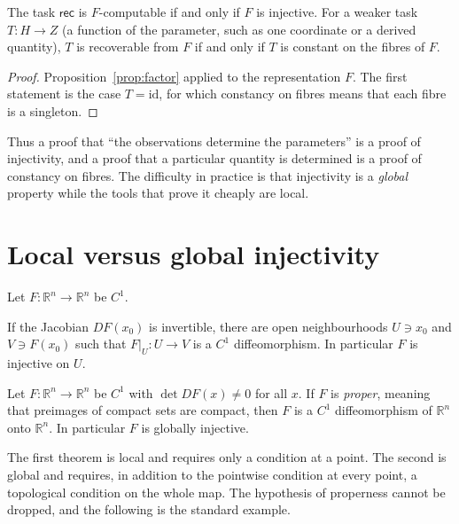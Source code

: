 \begin{proposition}[Identifiability]
\label{prop:ident}
The task $\mathsf{rec}$ is $F$-computable if and only if $F$ is injective. For a weaker task $T:H\to Z$ (a function of the parameter, such as one coordinate or a derived quantity), $T$ is recoverable from $F$ if and only if $T$ is constant on the fibres of $F$.
\end{proposition}

\begin{proof}
Proposition~\ref{prop:factor} applied to the representation $F$. The first statement is the case $T=\mathrm{id}$, for which constancy on fibres means that each fibre is a singleton.
\end{proof}

Thus a proof that ``the observations determine the parameters'' is a proof of injectivity, and a proof that a particular quantity is determined is a proof of constancy on fibres. The difficulty in practice is that injectivity is a \emph{global} property while the tools that prove it cheaply are local.

\section{Local versus global injectivity}
\label{sec:loc-glob}

Let $F:\mathbb R^n\to\mathbb R^n$ be $C^1$.

\begin{theorem}
\label{thm:ift}
 If the Jacobian $DF(x_0)$ is invertible, there are open neighbourhoods $U\ni x_0$ and $V\ni F(x_0)$ such that $F|_U:U\to V$ is a $C^1$ diffeomorphism. In particular $F$ is injective on $U$.
\end{theorem}

\begin{theorem}
\label{thm:hadamard}
 Let $F:\mathbb R^n\to\mathbb R^n$ be $C^1$ with $\det DF(x)\ne0$ for all $x$. If $F$ is \emph{proper}, meaning that preimages of compact sets are compact, then $F$ is a $C^1$ diffeomorphism of $\mathbb R^n$ onto $\mathbb R^n$. In particular $F$ is globally injective.
\end{theorem}

The first theorem is local and requires only a condition at a point. The second is global and requires, in addition to the pointwise condition at every point, a topological condition on the whole map. The hypothesis of properness cannot be dropped, and the following is the standard example.

